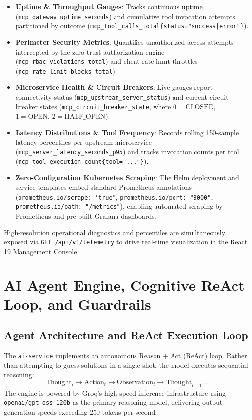 \documentclass[11pt,a4paper]{article}
\begin{document}
\begin{itemize}[leftmargin=*]
    \item \textbf{Uptime \& Throughput Gauges}: Tracks continuous uptime (\texttt{mcp\_gateway\_uptime\_seconds}) and cumulative tool invocation attempts partitioned by outcome (\texttt{mcp\_tool\_calls\_total\{status="success|error"\}}).
    \item \textbf{Perimeter Security Metrics}: Quantifies unauthorized access attempts intercepted by the zero-trust authorization engine (\texttt{mcp\_rbac\_violations\_total}) and client rate-limit throttles (\texttt{mcp\_rate\_limit\_blocks\_total}).
    \item \textbf{Microservice Health \& Circuit Breakers}: Live gauges report connectivity status (\texttt{mcp\_upstream\_server\_status}) and current circuit breaker states (\texttt{mcp\_circuit\_breaker\_state}, where $0=\text{CLOSED}$, $1=\text{OPEN}$, $2=\text{HALF\_OPEN}$).
    \item \textbf{Latency Distributions \& Tool Frequency}: Records rolling 150-sample latency percentiles per upstream microservice (\texttt{mcp\_server\_latency\_seconds\_p95}) and tracks invocation counts per tool (\texttt{mcp\_tool\_execution\_count\{tool="..."\}}).
    \item \textbf{Zero-Configuration Kubernetes Scraping}: The Helm deployment and service templates embed standard Prometheus annotations (\texttt{prometheus.io/scrape: "true"}, \texttt{prometheus.io/port: "8000"}, \texttt{prometheus.io/path: "/metrics"}), enabling automated scraping by Prometheus and pre-built Grafana dashboards.
\end{itemize}
High-resolution operational diagnostics and percentiles are simultaneously exposed via \texttt{GET /api/v1/telemetry} to drive real-time visualization in the React 19 Management Console.

\section{AI Agent Engine, Cognitive ReAct Loop, and Guardrails}

\subsection{Agent Architecture and ReAct Execution Loop}
The \texttt{ai-service} implements an autonomous Reason + Act (ReAct) loop. Rather than attempting to guess solutions in a single shot, the model executes sequential reasoning:
\begin{equation}
\text{Thought}_t \longrightarrow \text{Action}_t \longrightarrow \text{Observation}_t \longrightarrow \text{Thought}_{t+1} \dots
\end{equation}
The engine is powered by Groq's high-speed inference infrastructure using \texttt{openai/gpt-oss-120b} as the primary reasoning model, delivering output generation speeds exceeding 250 tokens per second.
\end{document}
